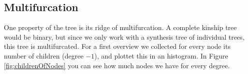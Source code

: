 
    \subsection{Multifurcation}
      One property of the tree is its ridge of multifurcation. A complete kinship tree would be binary, 
        but since we only work with a synthesis tree of individual trees, this tree is multifurcated. 
        For a first overview we collected for every node its number of children (degree $-1$), and 
        plottet this in an histogram. In Figure \ref{fig:childrenOfNodes} you can see how much nodes we 
        have for every degree. \\
       \\
